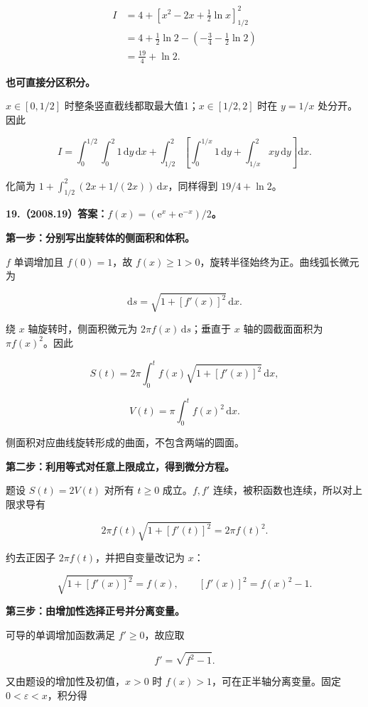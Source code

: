 \documentclass[UTF8,11pt,fontset=windows]{ctexart}
\begin{document}
$$
\begin{aligned}
I&=4+\left[x^2-2x+\frac12\ln x\right]_{1/2}^2\\
&=4+\frac12\ln2-
\left(-\frac34-\frac12\ln2\right)\\
&=\boxed{\frac{19}{4}+\ln2}.
\end{aligned}
$$

\textbf{也可直接分区积分。}

$x\in[0,1/2]$ 时整条竖直截线都取最大值1；$x\in[1/2,2]$ 时在 $y=1/x$ 处分开。因此

$$
I=\int_0^{1/2}\int_0^2 1\,\mathrm dy\,\mathrm dx
+\int_{1/2}^2\left[\int_0^{1/x}1\,\mathrm dy+
\int_{1/x}^2xy\,\mathrm dy\right]\mathrm dx.
$$

化简为 $1+\int_{1/2}^2(2x+1/(2x))\,\mathrm dx$，同样得到 $19/4+\ln2$。

\clearpage

\textbf{19.（2008.19）答案：$f(x)=(\mathrm e^x+\mathrm e^{-x})/2$。}

\textbf{第一步：分别写出旋转体的侧面积和体积。}

$f$ 单调增加且 $f(0)=1$，故 $f(x)\ge1>0$，旋转半径始终为正。曲线弧长微元为

$$
\mathrm ds=\sqrt{1+[f'(x)]^2}\,\mathrm dx.
$$

绕 $x$ 轴旋转时，侧面积微元为 $2\pi f(x)\,\mathrm ds$；垂直于 $x$ 轴的圆截面面积为 $\pi f(x)^2$。因此

$$
S(t)=2\pi\int_0^t f(x)\sqrt{1+[f'(x)]^2}\,\mathrm dx,
$$

$$
V(t)=\pi\int_0^t f(x)^2\,\mathrm dx.
$$

侧面积对应曲线旋转形成的曲面，不包含两端的圆面。

\textbf{第二步：利用等式对任意上限成立，得到微分方程。}

题设 $S(t)=2V(t)$ 对所有 $t\ge0$ 成立。$f,f'$ 连续，被积函数也连续，所以对上限求导有

$$
2\pi f(t)\sqrt{1+[f'(t)]^2}=2\pi f(t)^2.
$$

约去正因子 $2\pi f(t)$，并把自变量改记为 $x$：

$$
\sqrt{1+[f'(x)]^2}=f(x),
\qquad [f'(x)]^2=f(x)^2-1.
$$

\textbf{第三步：由增加性选择正号并分离变量。}

可导的单调增加函数满足 $f'\ge0$，故应取

$$
f'=\sqrt{f^2-1}.
$$

又由题设的增加性及初值，$x>0$ 时 $f(x)>1$，可在正半轴分离变量。固定 $0<\varepsilon<x$，积分得
\end{document}
